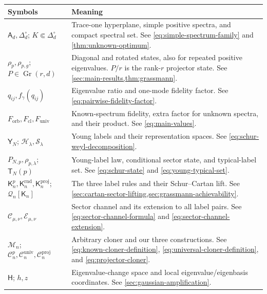 \documentclass[11pt]{article}
\theoremstyle{remark}
\theoremstyle{plain}
\newcommand{\cC}{\mathcal C}
\newcommand{\cE}{\mathcal E}
\newcommand{\cH}{\mathcal H}
\newcommand{\cM}{\mathcal M}
\newcommand{\cS}{\mathcal S}
\newcommand{\Gr}{\operatorname{Gr}}
\newcommand{\Forb}{F_{\mathrm{orb}}}
\newcommand{\Fcl}{F_{\mathrm{cl}}}
\newcommand{\Funiv}{F_{\mathrm{univ}}}
\begin{document}
\begingroup
\small
\setlength{\LTpre}{6pt}
\setlength{\LTpost}{6pt}
\renewcommand{\arraystretch}{1.42}
\begin{longtable}{@{}>{\raggedright\arraybackslash}p{.28\linewidth}>{\raggedright\arraybackslash}p{}@{}}
\textbf{Symbols} & \textbf{Meaning} \\ \hline
\endhead
\(\mathsf A_d,\Delta_d^\circ\); \(K\Subset\Delta_d^\circ\)
& Trace-one hyperplane, simple positive spectra, and compact spectral set.
  See \eqref{eq:simple-spectrum-family} and
  \cref{thm:unknown-optimum}. \\[3pt]
\(\rho_p,\rho_{p,g}\); \(P\in\Gr(r,d)\)
& Diagonal and rotated states, also for repeated positive eigenvalues.
  \(P/r\) is the rank-\(r\) projector state.  See
  \cref{sec:main-results,thm:grassmann}. \\[3pt]
\(q_{ij},f_\gamma(q_{ij})\)
& Eigenvalue ratio and one-mode fidelity factor. See
  \eqref{eq:pairwise-fidelity-factor}. \\[3pt]
\(\Forb,\Fcl,\Funiv\)
& Known-spectrum fidelity, extra factor for unknown spectra, and their
  product. See
  \eqref{eq:main-values}. \\[3pt]
\(\mathsf Y_N\); \(\cH_\lambda,\cS_\lambda\)
& Young labels and their representation spaces. See
  \eqref{eq:schur-weyl-decomposition}. \\[3pt]
\(P_{N,p},\rho_{p,\lambda}\); \(\mathsf T_N(p)\)
& Young-label law, conditional sector state, and typical-label set. See
  \eqref{eq:schur-state} and \eqref{eq:young-typical-set}. \\[3pt]
\(\mathsf K_n^p,\mathsf K_n^{\mathrm{rnd}},\mathsf K_n^{\mathrm{proj}}\); \(\mathcal Q_n[\mathsf K_n]\)
& The three label rules and their Schur--Cartan lift. See
  \cref{sec:cartan-sector-lifting,sec:grassmann-achievability}. \\[3pt]
\(\cC_{\mu,\nu},\cE_{\mu,\nu}\)
& Sector channel and its extension to all label pairs. See
  \eqref{eq:sector-channel-formula} and
  \eqref{eq:sector-channel-extension}. \\[3pt]
\(\cM_n\); \(\cC_n^p,\cC_n^{\mathrm{univ}},\cC_n^{\mathrm{proj}}\)
& Arbitrary cloner and our three constructions. See
  \eqref{eq:known-cloner-definition}, \eqref{eq:universal-cloner-definition},
  and \eqref{eq:projector-cloner}. \\[3pt]
\(\mathsf H\); \(h,z\)
& Eigenvalue-change space and local eigenvalue/eigenbasis coordinates. See
  \cref{sec:gaussian-amplification}. \\[3pt]

\end{longtable}
\end{document}
